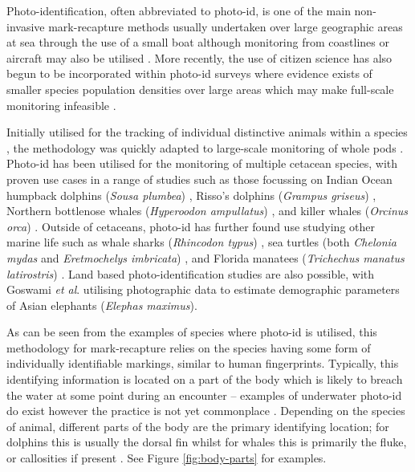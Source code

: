 Photo-identification, often abbreviated to photo-id, is one of the main non-invasive mark-recapture methods usually undertaken over large geographic areas at sea through the use of a small boat although monitoring from coastlines or aircraft may also be utilised \cite{hammond_individual_1990, evans_monitoring_2004, payne_long_1986, forney_seasonal_1998, wursig_methods_1990}. More recently, the use of citizen science has also begun to be incorporated within photo-id surveys where evidence exists of smaller species population densities over large areas which may make full-scale monitoring infeasible \cite{gibson_using_2020, cheney_integrating_2013}.

Initially utilised for the tracking of individual distinctive animals within a species \cite{caldwell_evidence_1955, schevill_daily_1960}, the methodology was quickly adapted to large-scale monitoring of whole pods \cite{alves_population_2013, franklin_migratory_2008}. Photo-id has been utilised for the monitoring of multiple cetacean species, with proven use cases in a range of studies such as those focussing on Indian Ocean humpback dolphins (\textit{Sousa plumbea}) \cite{sharpe_indian_2019}, Risso's dolphins (\textit{Grampus griseus}) \cite{miragliuolo_rissos_2004}, Northern bottlenose whales (\textit{Hyperoodon ampullatus}) \cite{feyrer_origin_2021}, and killer whales (\textit{Orcinus orca}) \cite{bigg_assessment_1982}. Outside of cetaceans, photo-id has further found use studying other marine life such as whale sharks (\textit{Rhincodon typus}) \cite{holmberg_estimating_2009}, sea turtles (both \textit{Chelonia mydas} and \textit{Eretmochelys imbricata}) \cite{reisser_photographic_2008}, and Florida manatees (\textit{Trichechus manatus latirostris}) \cite{langtimm_survival_2004}. Land based photo-identification studies are also possible, with Goswami \textit{et al}. \cite{goswami_application_2007} utilising photographic data to estimate demographic parameters of Asian elephants (\textit{Elephas maximus}).

As can be seen from the examples of species where photo-id is utilised, this methodology for mark-recapture relies on the species having some form of individually identifiable markings, similar to human fingerprints. Typically, this identifying information is located on a part of the body which is likely to breach the water at some point during an encounter -- examples of underwater photo-id do exist however the practice is not yet commonplace \cite{vanbressem_visual_2018, veronique_underwater_2022}. Depending on the species of animal, different parts of the body are the primary identifying location; for dolphins this is usually the dorsal fin whilst for whales this is primarily the fluke, or callosities if present \cite{vernazzani_eastern_2013, arnbom_individual_1987, constantine_abundance_2012, sharpe_indian_2019, baird_population_2009}. See Figure \ref{fig:body-parts} for examples.

